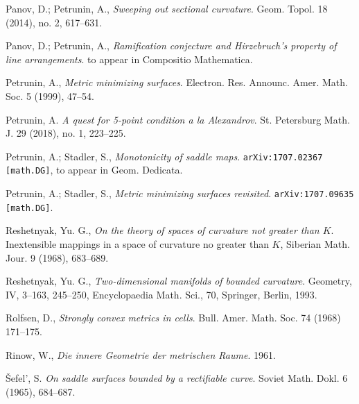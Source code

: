 \begin{thebibliography}{52}
Panov, D.; Petrunin, A.,
\textit{Sweeping out sectional curvature}. 
Geom. Topol. 
18 
(2014), 
no. 2, 
617--631. 

Panov, D.; Petrunin, A.,
\textit{Ramification conjecture and Hirzebruch's property of line arrangements}.
to appear in Compositio Mathematica.

Petrunin, A.,
\textit{Metric minimizing surfaces}.
Electron. Res. Announc. Amer. Math. Soc. 
5 
(1999), 
47--54.

Petrunin, A. 
\textit{A quest for 5-point condition a la Alexandrov}.
St. Petersburg Math. J. 29 (2018), no. 1, 223--225.

Petrunin, A.; 
Stadler, S., 
\textit{Monotonicity of saddle maps}.
\texttt{arXiv:1707.02367 [math.DG]}, to appear in Geom. Dedicata.

Petrunin, A.; 
Stadler, S., 
\textit{Metric minimizing surfaces revisited}.
\texttt{arXiv:1707.09635 [math.DG]}.

Reshetnyak, Yu. G.,
\textit{On the theory of spaces of curvature not greater than $K$}.
Inextensible mappings in a space of curvature
no greater than $K$, Siberian Math. Jour. 9 (1968), 683--689.

Reshetnyak, Yu. G., 
\textit{Two-dimensional manifolds of bounded curvature}.
Geometry, IV, 3--163, 245--250, Encyclopaedia Math. Sci., 70, Springer, Berlin, 1993.

Rolfsen, D.,
\textit{Strongly convex metrics in cells}.
Bull. Amer. Math. Soc. 74 (1968) 171–175.

Rinow, W., 
\textit{Die innere Geometrie der metrischen Raume}.
1961.

\v{S}efel', S.
\textit{On saddle surfaces bounded by a rectifiable curve}.
Soviet Math. Dokl. 6 (1965), 684--687.



\end{thebibliography}
